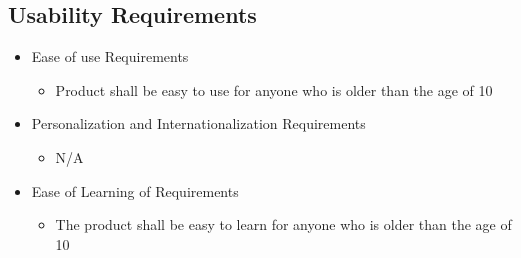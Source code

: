 \documentclass[12pt]{article}
\begin{document}
\subsection{Usability Requirements}
\begin{itemize}
    \item Ease of use Requirements
    \begin{itemize}
        \item Product shall be easy to use for anyone who is older than the age of 10
    \end{itemize}
    \item Personalization and Internationalization Requirements
    \begin{itemize}
        \item N/A
    \end{itemize}
    \item Ease of Learning of Requirements
    \begin{itemize}
        \item The product shall be easy to learn for anyone who is older than the age of 10
    \end{itemize}
\end{itemize}
\end{document}
